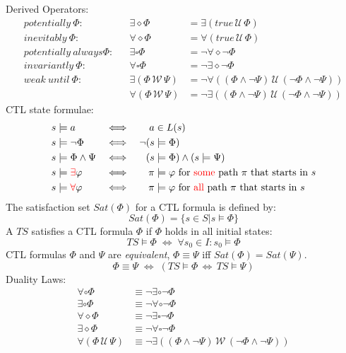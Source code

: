 \documentclass[a4paper, 10pt]{article}
\newcommand{\until}{\,\mathcal{U}\,}
\newcommand{\wuntil}{\,\mathcal{W}\,}
\begin{document}
\begin{mdframed}
Derived Operators:
\begin{align*}
potentially\ \Phi: && \exists\diamond\Phi&=\exists(true\until\Phi) \\
inevitably\ \Phi: && \forall\diamond\Phi&=\forall(true\until\Phi) \\
potentially\ always \Phi: && \exists\square\Phi&=\neg\forall\diamond\neg\Phi \\
invariantly\ \Phi: && \forall\square\Phi&=\neg\exists\diamond\neg\Phi \\
weak\ until\ \Phi: && \exists(\Phi\wuntil\Psi) &= \neg\forall((\Phi\wedge\neg\Psi)\until(\neg\Phi\wedge\neg\Psi)) \\
&& \forall(\Phi\wuntil\Psi)&=\neg\exists((\Phi\wedge\neg\Psi)\until(\neg\Phi\wedge\neg\Psi))
\end{align*}
CTL state formulae:
\begin{align*}
s&\models a & \iff& & a&\in L(s) \\
s&\models\neg\Phi &\iff& & \neg(s&\models\Phi) \\
s&\models\Phi\wedge\Psi &\iff&& (s&\models\Phi)\wedge(s\models\Psi) \\
s&\models\textcolor{red}{\exists}\varphi &\iff&& \pi&\models\varphi \text{ for \textcolor{red}{some} path $\pi$ that starts in $s$} \\
s&\models\textcolor{red}{\forall}\varphi &\iff&& \pi&\models\varphi \text{ for \textcolor{red}{all} path $\pi$ that starts in $s$} \\
\end{align*}
The satisfaction set $Sat(\Phi)$ for a CTL formula is defined by: \[ Sat(\Phi)=\{ s\in S| s\models\Phi \} \]
A $TS$ satisfies a CTL formula $\Phi$ if $\Phi$ holds in all initial states: \[ TS\models\Phi \; \iff\; \forall s_0\in I: s_0\models\Phi \]
CTL formulas $\Phi$ and $\Psi$ are \emph{equivalent}, $\Phi\equiv\Psi$ iff $Sat(\Phi)=Sat(\Psi)$.
\[ \Phi\equiv\Psi\;\iff\;(TS\models\Phi\,\iff\,TS\models\Psi) \]
Duality Laws:
\begin{align*}
\forall\circ\Phi &\equiv \neg\exists\circ\neg\Phi \\
\exists\circ\Phi &\equiv \neg\forall\circ\neg\Phi \\
\forall\diamond\Phi &\equiv \neg\exists\square\neg\Phi \\
\exists\diamond\Phi &\equiv \neg\forall\square\neg\Phi \\
\forall(\Phi\until\Psi) &\equiv \neg\exists((\Phi\wedge\neg\Psi)\wuntil(\neg\Phi\wedge\neg\Psi))

\end{align*}
\end{mdframed}
\end{document}
